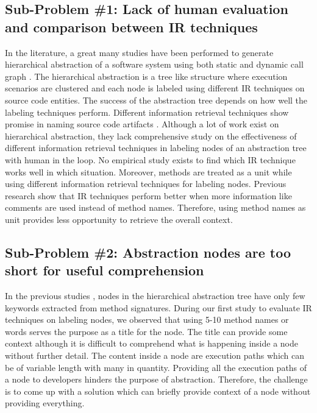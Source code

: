     \subsection{Sub-Problem \#1: Lack of human evaluation and comparison between IR techniques} In the literature, a great many studies have been performed to generate hierarchical abstraction of a software system using both static and dynamic call graph \cite{feng2018hierarchicalExecutionComprehension, gharibi2018automaticStaticCluster, xin2019identifyingFeaturesExecution}. The hierarchical abstraction is a tree like structure where execution scenarios are clustered and each node is labeled using different IR techniques on source code entities. The success of the abstraction tree depends on how well the labeling techniques perform. Different information retrieval techniques show promise in naming source code artifacts \cite{chen2016topicMiningRepositories, panichella2013topicModelsTasks, sun2016surveyTopicSE}. Although a lot of work exist on hierarchical abstraction, they lack comprehensive study on the effectiveness of different information retrieval techniques in labeling nodes of an abstraction tree with human in the loop. No empirical study exists to find which IR technique works well in which situation. Moreover, methods are treated as a unit \cite{gharibi2018automaticStaticCluster, feng2018hierarchicalExecutionComprehension} while using different information retrieval techniques for labeling nodes. Previous research \cite{de2012IRMethodsArtifacts} show that IR techniques perform better when more information like comments are used instead of method names. Therefore, using method names as unit provides less opportunity to retrieve the overall context.
    

    \subsection{Sub-Problem \#2: Abstraction nodes are too short for useful comprehension}
    In the previous studies \cite{feng2018hierarchicalExecutionComprehension, gharibi2018automaticStaticCluster}, nodes in the hierarchical abstraction tree have only few keywords extracted from method signatures. During our first study to evaluate IR techniques on labeling nodes, we observed that using 5-10 method names or words serves the purpose as a title for the node. The title can provide some context although it is difficult to comprehend what is happening inside a node without further detail. The content inside a node are execution paths which can be of variable length with many in quantity. Providing all the execution paths of a node to developers hinders the purpose of abstraction. Therefore, the challenge is to come up with a solution which can briefly provide context of a node without providing everything. 
    
